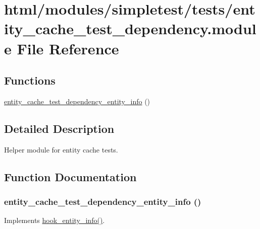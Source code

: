 \hypertarget{entity__cache__test__dependency_8module}{
\section{html/modules/simpletest/tests/entity\_\-cache\_\-test\_\-dependency.module File Reference}
\label{entity__cache__test__dependency_8module}
}
\subsection*{Functions}
\begin{DoxyCompactItemize}
\item 
\hyperlink{entity__cache__test__dependency_8module_aefb386090205f182e44675503615ce16}{entity\_\-cache\_\-test\_\-dependency\_\-entity\_\-info} ()
\end{DoxyCompactItemize}


\subsection{Detailed Description}
Helper module for entity cache tests. 

\subsection{Function Documentation}
\hypertarget{entity__cache__test__dependency_8module_aefb386090205f182e44675503615ce16}{
\subsubsection[{entity\_\-cache\_\-test\_\-dependency\_\-entity\_\-info}]{\setlength{\rightskip}{0pt plus 5cm}entity\_\-cache\_\-test\_\-dependency\_\-entity\_\-info ()}}
\label{entity__cache__test__dependency_8module_aefb386090205f182e44675503615ce16}
Implements \hyperlink{group__hooks_gaf02318e9d0e8cdbf6d187b271b9969a8}{hook\_\-entity\_\-info()}. 